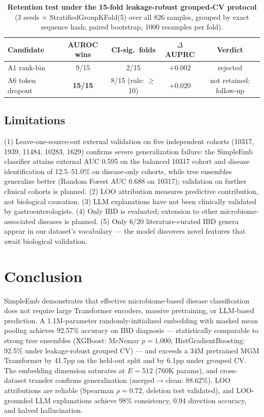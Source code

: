 \documentclass[11pt,a4paper]{article}
\begin{document}
\begin{table}[ht]
\centering
\caption{\textbf{Retention test under the 15-fold leakage-robust grouped-CV protocol} (3 seeds $\times$ StratifiedGroupKFold(5) over all 826 samples, grouped by exact sequence hash; paired bootstrap, 1000 resamples per fold).}
\label{tab:map_retention}
\begin{tabular}{lcccc}
\toprule
Candidate & AUROC wins & CI-sig.\ folds & $\Delta$AUPRC & Verdict \\
\midrule
A1 rank-bin & 9/15 & 2/15 & $+0.002$ & rejected \\
A6 token dropout & \textbf{15/15} & 8/15 (rule: $\geq$10) & $+0.020$ & not retained; follow-up \\
\bottomrule
\end{tabular}
\end{table}

\subsection{Limitations}

(1) Leave-one-source-out external validation on five independent cohorts (10317, 1939, 11484, 10283, 1629) confirms severe generalization failure: the SimpleEmb classifier attains external AUC 0.595 on the balanced 10317 cohort and disease identification of 12.5--51.0\% on disease-only cohorts, while tree ensembles generalize better (Random Forest AUC 0.688 on 10317); validation on further clinical cohorts is planned. (2) LOO attribution measures predictive contribution, not biological causation. (3) LLM explanations have not been clinically validated by gastroenterologists. (4) Only IBD is evaluated; extension to other microbiome-associated diseases is planned. (5) Only 6/20 literature-curated IBD genera appear in our dataset's vocabulary --- the model discovers novel features that await biological validation.

\section{Conclusion}

SimpleEmb demonstrates that effective microbiome-based disease classification does not require large Transformer encoders, massive pretraining, or LLM-based prediction. A 1.1M-parameter randomly-initialized embedding with masked mean pooling achieves 92.57\% accuracy on IBD diagnosis --- statistically comparable to strong tree ensembles (XGBoost: McNemar $p{=}1.000$; HistGradientBoosting: 92.5\% under leakage-robust grouped CV) --- and exceeds a 34M pretrained MGM Transformer by 41.7pp on the held-out split and by 6.1pp under grouped CV. The embedding dimension saturates at $E{=}512$ (760K params), and cross-dataset transfer confirms generalization (merged$\rightarrow$clean: 88.62\%). LOO attributions are reliable (Spearman $\rho{=}0.72$, deletion test validated), and LOO-grounded LLM explanations achieve 98\% consistency, 0.94 direction accuracy, and halved hallucination.
\end{document}
